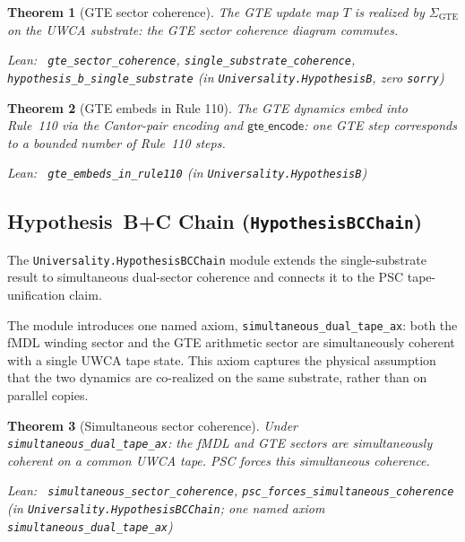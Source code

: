 \documentclass[11pt,a4paper]{article}
\newenvironment{leanref}%
  {\par\smallskip\noindent\begingroup\raggedright\textup{Lean:}~}%
  {\par\endgroup}
\newtheorem{theorem}{Theorem}[section]
\theoremstyle{definition}
\begin{document}
\begin{theorem}[GTE sector coherence]\label{thm:gte-sector-coherence}
The GTE update map $T$ is realized by $\Sigma_{\mathrm{GTE}}$ on the UWCA substrate:
the GTE sector coherence diagram commutes.

\begin{leanref}
\lstinline|gte_sector_coherence|, \lstinline|single_substrate_coherence|,
\lstinline|hypothesis_b_single_substrate|
\textup{(in \texttt{Universality.HypothesisB}, zero \texttt{sorry})}
\end{leanref}
\end{theorem}

\begin{theorem}[GTE embeds in Rule 110]\label{thm:gte-embeds-rule110}
The GTE dynamics embed into Rule~110 via the Cantor-pair encoding and
$\mathsf{gte\_encode}$: one GTE step corresponds to a bounded number of Rule~110 steps.

\begin{leanref}
\lstinline|gte_embeds_in_rule110|
\textup{(in \texttt{Universality.HypothesisB})}
\end{leanref}
\end{theorem}

\subsection{Hypothesis~B+C Chain (\texttt{HypothesisBCChain})}\label{subsec:hypothesis-bc-chain}

The \texttt{Universality.HypothesisBCChain} module extends the single-substrate result
to simultaneous dual-sector coherence and connects it to the PSC tape-unification claim.

The module introduces one named axiom, \texttt{simultaneous\_dual\_tape\_ax}: both the
fMDL winding sector and the GTE arithmetic sector are simultaneously coherent with
a single UWCA tape state.  This axiom captures the physical assumption that the two
dynamics are co-realized on the same substrate, rather than on parallel copies.

\begin{theorem}[Simultaneous sector coherence]\label{thm:simultaneous-coherence}
Under \texttt{simultaneous\_dual\_tape\_ax}: the fMDL and GTE sectors are simultaneously
coherent on a common UWCA tape.  PSC forces this simultaneous coherence.

\begin{leanref}
\lstinline|simultaneous_sector_coherence|,
\lstinline|psc_forces_simultaneous_coherence|
\textup{(in \texttt{Universality.HypothesisBCChain};
one named axiom \texttt{simultaneous\_dual\_tape\_ax})}
\end{leanref}
\end{theorem}
\end{document}
